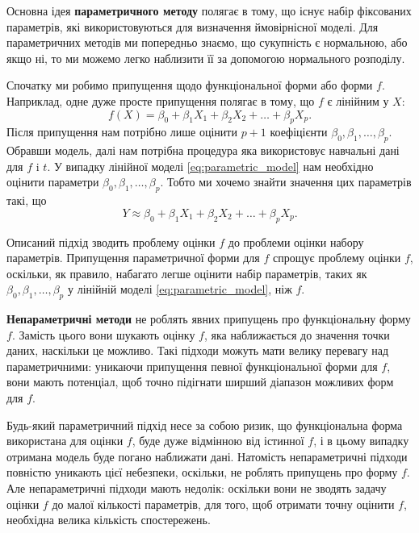 \documentclass[14pt,a4paper]{extarticle}
\newcounter{e}
\numberwithin{equation}{section}
\numberwithin{figure}{section}
\begin{document}
	Основна ідея \textbf{параметричного методу} полягає в тому, що існує набір фіксованих параметрів, які використовуються для визначення ймовірнісної моделі. Для параметричних методів ми попередньо знаємо, що сукупність є нормальною, або якщо ні, то ми можемо легко наблизити її за допомогою нормального розподілу. \newline
	
	Спочатку ми робимо припущення щодо функціональної форми або форми $f$. Наприклад, одне дуже просте припущення полягає в тому, що $f$ є лінійним у $X$:
	\begin{equation}
		\label{eq:parametric_model}
		f(X)=\beta_{0}+\beta_{1} X_{1}+\beta_{2} X_{2}+\ldots+\beta_{p} X_{p} .
	\end{equation} \newline
	Після припущення нам потрібно лише оцінити $p+1$ коефіцієнти $\beta_{0}, \beta_{1}, \ldots, \beta_{p}$. Обравши модель, далі нам потрібна процедура яка використовує навчальні дані для $f$ i $t$. У випадку лінійної моделі \ref{eq:parametric_model} нам необхідно оцінити параметри $\beta_{0}, \beta_{1}, \ldots, \beta_{p}$. Тобто ми хочемо знайти значення цих параметрів такі, що
	$$
	Y \approx \beta_{0}+\beta_{1} X_{1}+\beta_{2} X_{2}+\ldots+\beta_{p} X_{p} .
	$$
	
	Описаний підхід зводить проблему оцінки $f$ до проблеми оцінки набору параметрів. Припущення параметричної форми для $f$ спрощує проблему оцінки $f$, оскільки, як правило, набагато легше оцінити набір параметрів, таких як $\beta_{0}, \beta_{1}, \ldots, \beta_{p}$ у лінійній моделі \ref{eq:parametric_model}, ніж $f$. \newline 
		
    \textbf{Непараметричні методи} не роблять явних припущень про функціональну форму $f$. Замість цього вони шукають оцінку $f$, яка наближається до значення точки даних, наскільки це можливо. Такі підходи можуть мати велику перевагу над параметричними: уникаючи припущення певної функціональної форми для $f$, вони мають потенціал, щоб точно підігнати ширший діапазон можливих форм для $f$.\newline
    
    Будь-який параметричний підхід несе за собою ризик, що функціональна форма використана для оцінки $f$, буде дуже відмінною від істинної $f$, і в цьому випадку отримана модель буде погано наближати дані. Натомість непараметричні підходи повністю уникають цієї небезпеки, оскільки, не роблять припущень про форму $f$. Але непараметричні підходи мають недолік: оскільки вони не зводять задачу оцінки $f$ до малої кількості параметрів, для того, щоб отримати точну оцінити $f$, необхідна велика кількість спостережень. \newline
    	
\end{document}
